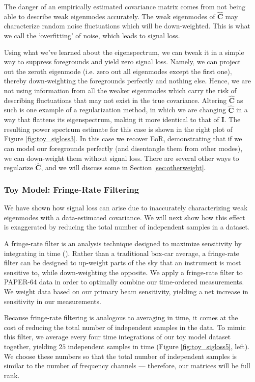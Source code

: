 \documentclass[preprint2,numberedappendix,tighten]{aastex6}  %
\begin{document}
The danger of an empirically estimated covariance matrix comes from not being able to describe weak eigenmodes accurately. The weak eigenmodes of $\hat{\textbf{C}}$ may characterize random noise fluctuations which will be down-weighted. This is what we call the `overfitting' of noise, which leads to signal loss. 

Using what we've learned about the eigenspectrum, we can tweak it in a simple way to suppress foregrounds and yield zero signal loss. Namely, we can project out the zeroth eigenmode (i.e. zero out all eigenmodes except the first one), thereby down-weighting the foregrounds perfectly and nothing else. Hence, we are not using information from all the weaker eigenmodes which carry the risk of describing fluctuations that may not exist in the true covariance. Altering $\hat{\textbf{C}}$ as such is one example of a regularization method, in which we are changing $\hat{\textbf{C}}$ in a way that flattens its eigenspectrum, making it more identical to that of $\textbf{I}$. The resulting power spectrum estimate for this case is shown in the right plot of Figure \ref{fig:toy_sigloss3}. In this case we recover EoR, demonstrating that if we can model our foregrounds perfectly (and disentangle them from other modes), we can down-weight them without signal loss. There are several other ways to regularize $\hat{\textbf{C}}$, and we will discuss some in Section \ref{sec:otherweight}.

\subsubsection{Toy Model: Fringe-Rate Filtering}

We have shown how signal loss can arise due to inaccurately characterizing weak eigenmodes with a data-estimated covariance. We will next show how this effect is exaggerated by reducing the total number of independent samples in a dataset. 

A fringe-rate filter is an analysis technique designed to maximize sensitivity by integrating in time (\citealt{parsons_et_al2016}). Rather than a traditional box-car average, a fringe-rate filter can be designed to up-weight parts of the sky that an instrument is most sensitive to, while down-weighting the opposite. We apply a fringe-rate filter to PAPER-64 data in order to optimally combine our time-ordered measurements. We weight data based on our primary beam sensitivity, yielding a net increase in sensitivity in our measurements.

Because fringe-rate filtering is analogous to averaging in time, it comes at the cost of reducing the total number of independent samples in the data. To mimic this filter, we average every four time integrations of our toy model dataset together, yielding $25$ independent samples in time (Figure \ref{fig:toy_sigloss5}, left). We choose these numbers so that the total number of independent samples is similar to the number of frequency channels --- therefore, our matrices will be full rank. 
\end{document}

